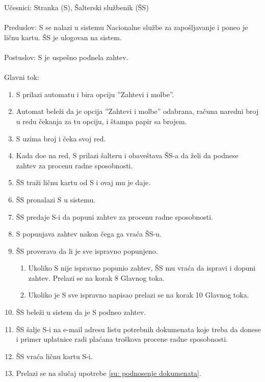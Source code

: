 \noindent U\v cesnici: Stranka (S), \v Salterski slu\v zbenik (\v SS)
\\
\\ Preduslov: S se nalazi u sistemu Nacionalne slu\v zbe za zapo\v sljavanje i poneo je li\v cnu kartu.  \v SS je ulogovan na sistem.
\\
\\ Postuslov: S je uspe\v sno podnela zahtev.
\\
\\ Glavni tok:
\begin{enumerate}
	\item S prilazi automatu i bira opciju ''Zahtevi i molbe''.
	\item Automat bele\v zi da je opcija ''Zahtevi i molbe'' odabrana, ra\v cuna naredni broj u redu \v cekanja za tu opciju, i \v stampa papir sa brojem.
	\item S uzima broj i \v ceka svoj red.
	\item Kada do\dj e na red, S prilazi \v salteru i obave\v stava \v SS-a da \v zeli da podnese zahtev za procenu radne sposobnosti.
	\item \v SS tra\v zi li\v cnu kartu od S i ovaj mu je daje.
	\item \v SS pronalazi S u sistemu.
	\item \v SS predaje S-i da popuni zahtev za procenu radne sposobnosti.
	\item S popunjava zahtev nakon \v cega ga vra\' ca \v SS-u.
	\item \v SS proverava da li je sve ispravno popunjeno.
	\begin{enumerate}
		\item Ukoliko S nije ispravno popunio zahtev, \v SS mu vra\' ca da ispravi i dopuni zahtev. Prelazi se na korak 8 Glavnog toka.
		\item Ukoliko je S sve ispravno napisao prelazi se na korak 10 Glavnog toka.
	\end{enumerate}
	
	\item \v SS bele\v zi u sistem da je S podneo zahtev.
	\item \v SS \v salje S-i na e-mail adresu listu potrebnih dokumenata koje treba da donese i primer uplatnice radi pla\' cana tro\v skova procene radne sposobnosti.
	\item \v SS vra\' ca li\v cnu kartu S-i.
	\item Prelazi se na slu\v caj upotrebe \ref{su: podnosenje dokumenata}.
\end{enumerate}

